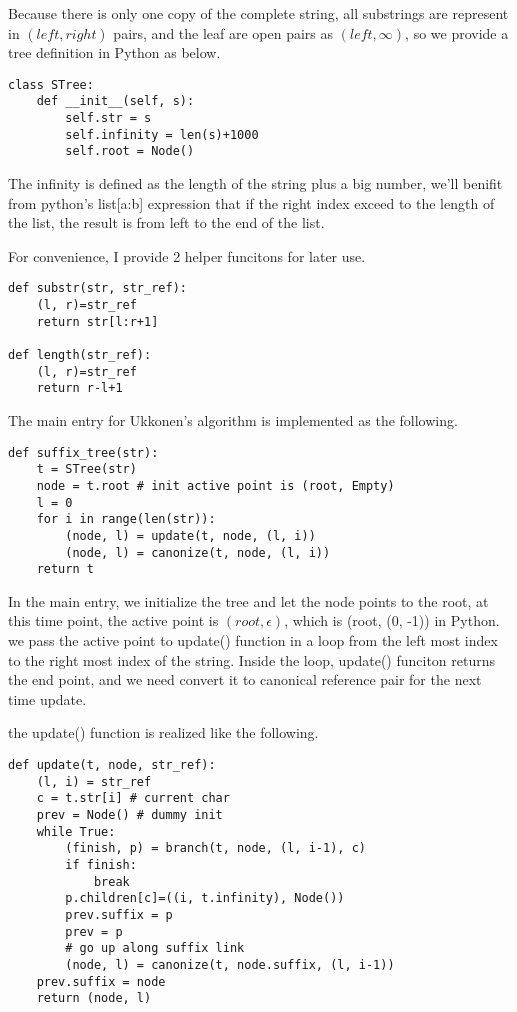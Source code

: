 \documentclass{article}
\begin{document}
Because there is only one copy of the complete string, all substrings
are represent in $(left, right)$ pairs, and the leaf are open pairs
as $(left, \infty)$, so we provide a tree definition in Python as below.

\begin{lstlisting}
class STree:
    def __init__(self, s):
        self.str = s
        self.infinity = len(s)+1000
        self.root = Node()
\end{lstlisting}

The infinity is defined as the length of the string plus a big number, we'll
benifit from python's list[a:b] expression that if the right index exceed to the
length of the list, the result is from left to the end of the list.

For convenience, I provide 2 helper funcitons for later use.

\begin{lstlisting}
def substr(str, str_ref):
    (l, r)=str_ref
    return str[l:r+1]

def length(str_ref):
    (l, r)=str_ref
    return r-l+1
\end{lstlisting}

The main entry for Ukkonen's algorithm is implemented as the following.

\begin{lstlisting}
def suffix_tree(str):
    t = STree(str)
    node = t.root # init active point is (root, Empty)
    l = 0
    for i in range(len(str)):
        (node, l) = update(t, node, (l, i))
        (node, l) = canonize(t, node, (l, i))
    return t
\end{lstlisting}

In the main entry, we initialize the tree and let the node points to the
root, at this time point, the active point is $(root, \epsilon)$, which
is (root, (0, -1)) in Python. we pass the active point to update() function 
in a loop from the left most index to the right most index of the string.
Inside the loop, update() funciton returns the end point, and we need 
convert it to canonical reference pair for the next time update.

the update() function is realized like the following.

\begin{lstlisting}
def update(t, node, str_ref):
    (l, i) = str_ref 
    c = t.str[i] # current char
    prev = Node() # dummy init 
    while True:
        (finish, p) = branch(t, node, (l, i-1), c)
        if finish:
            break
        p.children[c]=((i, t.infinity), Node())
        prev.suffix = p
        prev = p
        # go up along suffix link
        (node, l) = canonize(t, node.suffix, (l, i-1))
    prev.suffix = node
    return (node, l)
\end{lstlisting}
\end{document}
